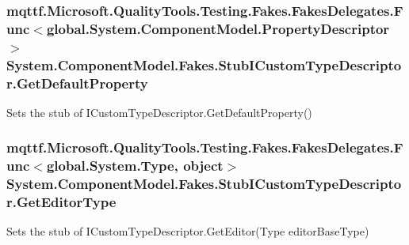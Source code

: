 \hypertarget{class_system_1_1_component_model_1_1_fakes_1_1_stub_i_custom_type_descriptor_a0667a97b17bc1a8e09bed41bfd5541d8}{
\subsubsection[{Get\-Default\-Property}]{\setlength{\rightskip}{0pt plus 5cm}mqttf.\-Microsoft.\-Quality\-Tools.\-Testing.\-Fakes.\-Fakes\-Delegates.\-Func$<$global.\-System.\-Component\-Model.\-Property\-Descriptor$>$ System.\-Component\-Model.\-Fakes.\-Stub\-I\-Custom\-Type\-Descriptor.\-Get\-Default\-Property}}\label{class_system_1_1_component_model_1_1_fakes_1_1_stub_i_custom_type_descriptor_a0667a97b17bc1a8e09bed41bfd5541d8}


Sets the stub of I\-Custom\-Type\-Descriptor.\-Get\-Default\-Property()

\hypertarget{class_system_1_1_component_model_1_1_fakes_1_1_stub_i_custom_type_descriptor_ac78c2d98ccbb90262ec4e0c1b5ea2086}{
\subsubsection[{Get\-Editor\-Type}]{\setlength{\rightskip}{0pt plus 5cm}mqttf.\-Microsoft.\-Quality\-Tools.\-Testing.\-Fakes.\-Fakes\-Delegates.\-Func$<$global.\-System.\-Type, object$>$ System.\-Component\-Model.\-Fakes.\-Stub\-I\-Custom\-Type\-Descriptor.\-Get\-Editor\-Type}}\label{class_system_1_1_component_model_1_1_fakes_1_1_stub_i_custom_type_descriptor_ac78c2d98ccbb90262ec4e0c1b5ea2086}


Sets the stub of I\-Custom\-Type\-Descriptor.\-Get\-Editor(\-Type editor\-Base\-Type)

